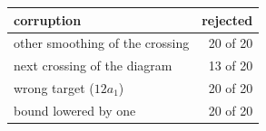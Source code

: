 \begin{tabular}{lr}
\toprule
corruption & rejected\\
\midrule
other smoothing of the crossing & 20 of 20\\
next crossing of the diagram & 13 of 20\\
wrong target ($12a_{1}$) & 20 of 20\\
bound lowered by one & 20 of 20\\
\bottomrule
\end{tabular}
